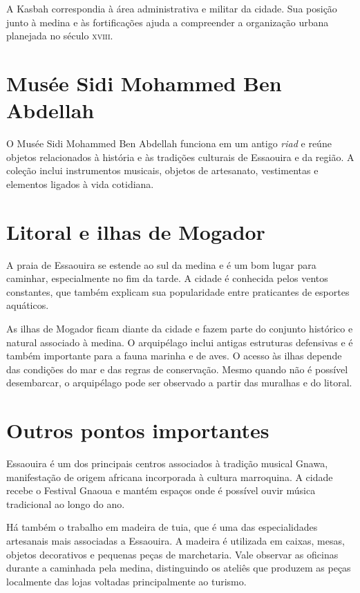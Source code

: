 A Kasbah correspondia à área administrativa e militar da cidade. Sua posição junto à medina e às fortificações ajuda a compreender a organização urbana planejada no século \textsc{xviii}. 

\chapter{Musée Sidi Mohammed Ben Abdellah}

O Musée Sidi Mohammed Ben Abdellah funciona em um antigo \textit{riad} e reúne objetos relacionados à história e às tradições culturais de Essaouira e da região. A coleção inclui instrumentos musicais, objetos de artesanato, vestimentas e elementos ligados à vida cotidiana.

\chapter{Litoral e ilhas de Mogador}

A praia de Essaouira se estende ao sul da medina e é um bom lugar para caminhar, especialmente no fim da tarde. A cidade é conhecida pelos ventos constantes, que também explicam sua popularidade entre praticantes de esportes aquáticos.

As ilhas de Mogador ficam diante da cidade e fazem parte do conjunto histórico e natural associado à medina. O arquipélago inclui antigas estruturas defensivas e é também importante para a fauna marinha e de aves. O acesso às ilhas depende das condições do mar e das regras de conservação. Mesmo quando não é possível desembarcar, o arquipélago pode ser observado a partir das muralhas e do \mbox{litoral.}

\chapter{Outros pontos importantes}

Essaouira é um dos principais centros associados à tradição musical Gnawa, manifestação de origem africana incorporada à cultura marroquina. A cidade recebe o Festival Gnaoua e mantém espaços onde é possível ouvir música tradicional ao longo do ano.

Há também o trabalho em madeira de tuia, que é uma das especialidades artesanais mais associadas a Essaouira. A madeira é utilizada em caixas, mesas, objetos decorativos e pequenas peças de marchetaria. Vale observar as oficinas durante a caminhada pela medina, distinguindo os ateliês que produzem as peças localmente das lojas voltadas principalmente ao turismo.